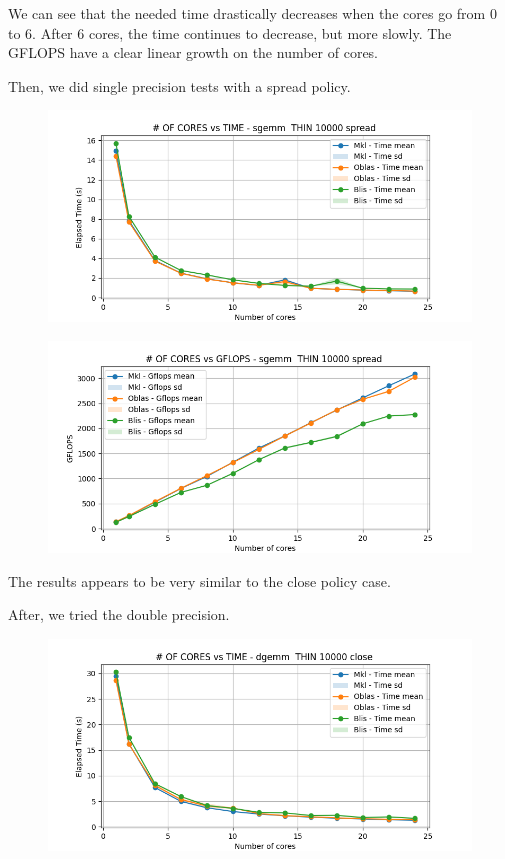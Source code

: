 \documentclass[12pt, titlepage]{report}
\begin{document}
We can see that the needed time drastically decreases when the cores go from 0 to 6. After 6 cores, the time continues to decrease, but more slowly. The GFLOPS have a clear linear growth on the number of cores.

Then, we did single precision tests with a spread policy.
\begin{figure}[H]
    \centering
    \includegraphics[width=\textwidth]{THIN scalability/sgemm__THIN_10000_spread_time.png}
\end{figure}

\begin{figure}[H]
    \centering
    \includegraphics[width=\textwidth]{THIN scalability/sgemm__THIN_10000_spread_gflops.png}
\end{figure}

The results appears to be very similar to the close policy case. 

After, we tried the double precision.
\begin{figure}[H]
    \centering
    \includegraphics[width=\textwidth]{THIN scalability/dgemm__THIN_10000_close_time.png}
\end{figure}
\end{document}
